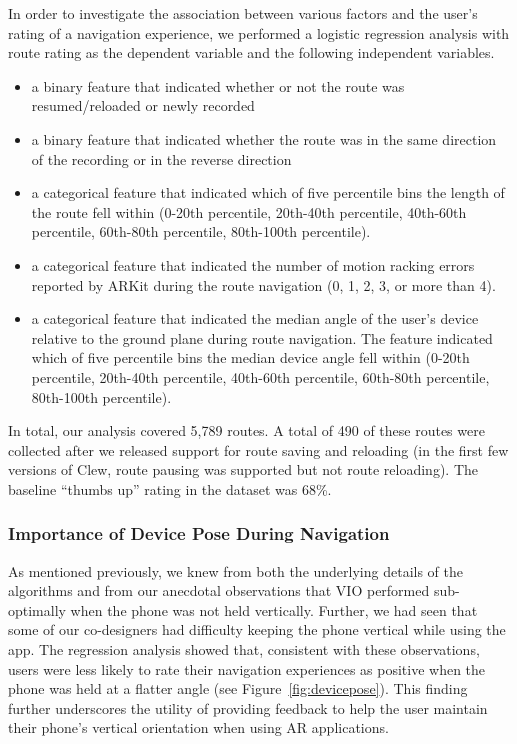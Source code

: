 \documentclass[chi_draft]{sigchi}
\begin{document}
In order to investigate the association between various factors and the user's rating of a navigation experience, we performed a logistic regression analysis with route rating as the dependent variable and the following independent variables.
\begin{itemize}
\item a binary feature that indicated whether or not the route was resumed/reloaded or newly recorded
\item a binary feature that indicated whether the route was in the same direction of the recording or in the reverse direction
\item a categorical feature that indicated which of five percentile bins the length of the route fell within (0-20th percentile, 20th-40th percentile, 40th-60th percentile, 60th-80th percentile, 80th-100th percentile).
\item a categorical feature that indicated the number of motion racking errors reported by ARKit during the route navigation (0, 1, 2, 3, or more than 4).
\item a categorical feature that indicated the median angle of the user's device relative to the ground plane during route navigation.  The feature indicated which of five percentile bins the median device angle fell within (0-20th percentile, 20th-40th percentile, 40th-60th percentile, 60th-80th percentile, 80th-100th percentile).
\end{itemize}

In total, our analysis covered 5,789 routes.  A total of 490 of these routes were collected after we released support for route saving and reloading (in the first few versions of Clew, route pausing was supported but not route reloading).  The baseline ``thumbs up'' rating in the dataset was 68\%. 

\subsubsection{Importance of Device Pose During Navigation}


As mentioned previously, we knew from both the underlying details of the algorithms and from our anecdotal observations that VIO performed sub-optimally when the phone was not held vertically.  Further, we had seen that some of our co-designers had difficulty keeping the phone vertical while using the app. The regression analysis showed that, consistent with these observations, users were less likely to rate their navigation experiences as positive when the phone was held at a flatter angle (see Figure~\ref{fig:devicepose}).  This finding further underscores the utility of providing feedback to help the user maintain their phone's vertical orientation when using AR applications.
\end{document}
